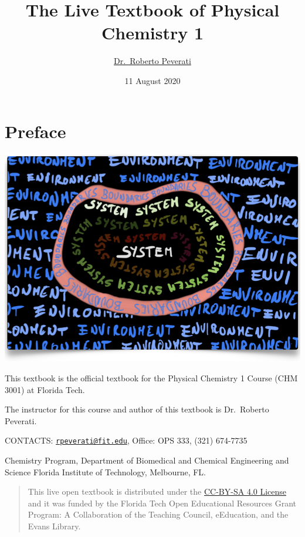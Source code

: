 \documentclass[
]{book}
\title{The Live Textbook of Physical Chemistry 1}
\author{\href{mailto:rpeverati@fit.edu}{Dr.~Roberto Peverati}}
\date{11 August 2020}
\let\oldmaketitle\maketitle
\theoremstyle{definition}
\theoremstyle{definition}
\theoremstyle{definition}
\theoremstyle{remark}
\begin{document}
\maketitle


\newpage

\let\maketitle\oldmaketitle

{
\setcounter{tocdepth}{1}
\tableofcontents
}
\hypertarget{preface}{%
\chapter*{Preface}\label{preface}}

\begin{center}\includegraphics[width=0.8\linewidth]{./img/OEP_Figures.000} \end{center}

This textbook is the official textbook for the Physical Chemistry 1 Course (CHM 3001) at Florida Tech.

The instructor for this course and author of this textbook is Dr.~Roberto Peverati.

CONTACTS: \href{mailto:rpeverati@fit.edu}{\nolinkurl{rpeverati@fit.edu}}, Office: OPS 333, (321) 674-7735

Chemistry Program, Department of Biomedical and Chemical Engineering and Science
Florida Institute of Technology, Melbourne, FL.

\begin{quote}
This live open textbook is distributed under the \href{https://creativecommons.org/licenses/by-sa/4.0/}{CC-BY-SA 4.0 License} and it was funded by the Florida Tech Open Educational Resources Grant Program: A Collaboration of the Teaching Council, eEducation, and the Evans Library.
\end{quote}
\end{document}
